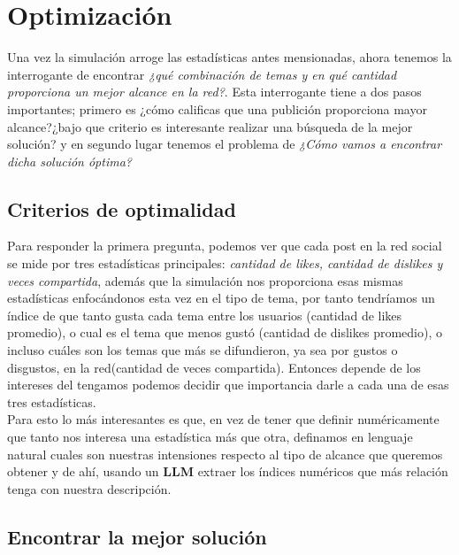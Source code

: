 \documentclass[12pt]{article}
\begin{document}
\section{Optimización}

Una vez la simulación arroge las estadísticas antes mensionadas, ahora tenemos la interrogante de encontrar \textit{¿qué combinación de temas y en qué cantidad proporciona un mejor alcance en la red?}.
Esta interrogante tiene a dos pasos importantes; primero es ¿cómo calificas que una publición proporciona mayor alcance?¿bajo que criterio es interesante realizar una búsqueda de la mejor solución? y
en segundo lugar tenemos el problema de \textit{¿Cómo vamos a encontrar dicha solución óptima?}

\subsection{Criterios de optimalidad}

Para responder la primera pregunta, podemos ver que cada post en la red social se mide por tres estadísticas principales: \textit{cantidad de likes, cantidad de dislikes y veces compartida}, además que
la simulación nos proporciona esas mismas estadísticas enfocándonos esta vez en el tipo de tema, por tanto tendríamos un índice de que tanto gusta cada tema entre los usuarios (cantidad de likes promedio),
o cual es el tema que menos gustó (cantidad de dislikes promedio), o incluso cuáles son los temas que más se difundieron, ya sea por gustos o disgustos, en la red(cantidad de veces compartida). Entonces depende
de los intereses del tengamos podemos decidir que importancia darle a cada una de esas tres estadísticas.
\\
Para esto lo más interesantes es que, en vez de tener que definir numéricamente que tanto nos interesa una estadística más que otra, definamos en lenguaje natural cuales son nuestras intensiones respecto al tipo 
de alcance que queremos obtener y de ahí, usando un \textbf{LLM} extraer los índices numéricos que más relación tenga con nuestra descripción.


\subsection{Encontrar la mejor solución}
\end{document}
